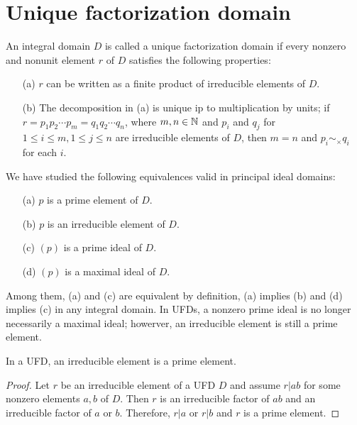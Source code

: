 \section{Unique factorization domain}

\begin{defi}
    An integral domain $D$ is called a unique factorization domain if every nonzero and nonunit element $r$ of $D$ satisfies the following properties:
    \begin{enumerate}
        \item[(a)]
        {
            $r$ can be written as a finite product of irreducible elements of $D$.
        }
        \item[(b)]
        {
            The decomposition in (a) is unique ip to multiplication by units; if $r=p_1p_2\cdots p_m=q_1q_2\cdots q_n$, where $m, n\in{\mathbb{N}}$ and $p_i$ and $q_j$ for $1\leq i\leq m, 1\leq j\leq n$ are irreducible elements of $D$, then $m=n$ and $p_i\sim_\times q_i$ for each $i$.
        }
    \end{enumerate}
\end{defi}

We have studied the following equivalences valid in principal ideal domains:
\begin{enumerate}
    \item[(a)]
    {
        $p$ is a prime element of $D$.
    }
    \item[(b)]
    {
        $p$ is an irreducible element of $D$.
    }
    \item[(c)]
    {
        $(p)$ is a prime ideal of $D$.
    }
    \item[(d)]
    {
        $(p)$ is a maximal ideal of $D$.
    }
\end{enumerate}
Among them, (a) and (c) are equivalent by definition, (a) implies (b) and (d) implies (c) in any integral domain.
In UFDs, a nonzero prime ideal is no longer necessarily a maximal ideal; howerver, an irreducible element is still a prime element.
\begin{prop}
    In a UFD, an irreducible element is a prime element.
\end{prop}
\begin{proof}
    Let $r$ be an irreducible element of a UFD $D$ and assume $r|ab$ for some nonzero elements $a, b$ of $D$.
    Then $r$ is an irreducible factor of $ab$ and an irreducible factor of $a$ or $b$.
    Therefore, $r|a$ or $r|b$ and $r$ is a prime element.
\end{proof}

